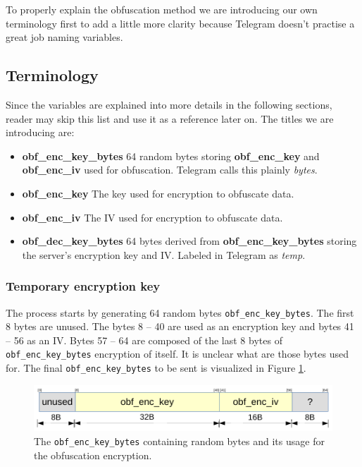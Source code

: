 \documentclass[thesis=M,english]{FITthesis}[2012/10/20]
\begin{document}
To properly explain the obfuscation method we are introducing our own terminology first to add a little more clarity because Telegram doesn't practise a great job naming variables.

\subsection{Terminology}

Since the variables are explained into more details in the following sections, reader may skip this list and use it as a reference later on. The titles we are introducing are:

\begin{itemize}
	\item \textbf{obf\_enc\_key\_bytes} 64 random bytes storing \textbf{obf\_enc\_key} and \textbf{obf\_enc\_iv} used for obfuscation. Telegram calls this plainly \emph{bytes}.
	\item \textbf{obf\_enc\_key} The key used for encryption to obfuscate data.
	\item \textbf{obf\_enc\_iv} The IV used for encryption to obfuscate data.
	\item \textbf{obf\_dec\_key\_bytes} 64 bytes derived from \textbf{obf\_enc\_key\_bytes} storing the server's encryption key and IV. Labeled in Telegram as \emph{temp}.
\end{itemize}

\subsubsection{Temporary encryption key}\label{code-obf-enc-key}

The process starts by generating 64 random bytes \texttt{obf\_enc\_key\_bytes}. The first 8 bytes are unused. The bytes 8 -- 40 are used as an encryption key and bytes 41 -- 56 as an IV. Bytes 57 -- 64 are composed of the last 8 bytes of \texttt{obf\_enc\_key\_bytes} encryption of itself. It is unclear what are those bytes used for. The final \texttt{obf\_enc\_key\_bytes} to be sent is visualized in Figure \ref{img:code-obfuscation-bytes-sent}.

\begin{figure}[htb]
	\centering
	\includegraphics[width=1\textwidth]{bytes-sent.pdf}
	\caption{The \texttt{obf\_enc\_key\_bytes} containing random bytes and its usage for the obfuscation encryption.}
	\label{img:code-obfuscation-bytes-sent}
\end{figure}
\end{document}
